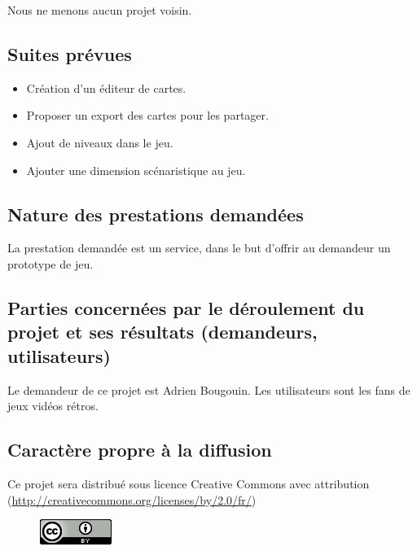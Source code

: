 \documentclass[11pt]{report}
\begin{document}
				Nous ne menons aucun projet voisin.
				
			\subsection{Suites prévues}
			
				\begin{itemize}
					\item Création d’un éditeur de cartes.
					\item Proposer un export des cartes pour les partager.
					\item Ajout de niveaux dans le jeu.
					\item Ajouter une dimension scénaristique au jeu.
    			\end{itemize}
    			
    		\subsection{Nature des prestations demandées}
    		
    			La prestation demandée est un service, dans le but d’offrir au demandeur un prototype de jeu.
    		
    		\subsection{Parties concernées par le déroulement du projet et ses résultats (demandeurs, utilisateurs)}
    		
    			Le demandeur de ce projet est Adrien Bougouin. Les utilisateurs sont les fans de jeux vidéos rétros.
    		
    		\subsection{Caractère propre à la diffusion}
    		
    			Ce projet sera distribué sous licence Creative Commons avec attribution (\url{http://creativecommons.org/licenses/by/2.0/fr/}) 

				\begin{figure}[h]
		      		\begin{center}
					  	\includegraphics[scale=0.8]{licence.png}
		      		\end{center}
				 \end{figure}
			
\end{document}
